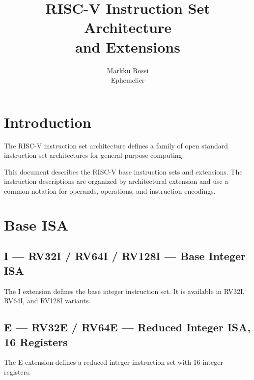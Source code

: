 \documentclass[11pt,a4paper]{article}
\begin{document}
\title{RISC-V Instruction Set Architecture\\
and Extensions}

\author{Markku Rossi\\
Ephemelier}

\date{}

\maketitle


\section{Introduction}

The RISC-V instruction set architecture defines a family of
open standard instruction set architectures for general-purpose
computing.

This document describes the RISC-V base instruction sets and
extensions. The instruction descriptions are organized by
architectural extension and use a common notation for operands,
operations, and instruction encodings.


\section{Base ISA}

\subsection{I --- RV32I / RV64I / RV128I --- Base Integer ISA}

The I extension defines the base integer instruction set.
It is available in RV32I, RV64I, and RV128I variants.

\subsection{E --- RV32E / RV64E --- Reduced Integer ISA, 16 Registers}

The E extension defines a reduced integer instruction set with
16 integer registers.

\end{document}
